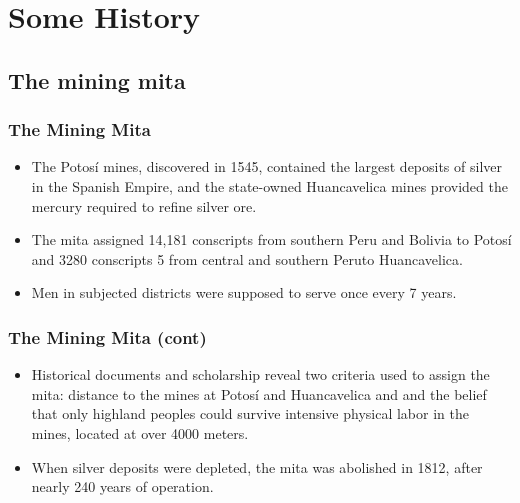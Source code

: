 \section{Some History}
\subsection{The mining mita}

\begin{frame}
\frametitle{The Mining Mita}

\begin{itemize}

 \item The Potosí mines, discovered in 1545, contained the largest deposits of silver in the Spanish Empire, and the state-owned Huancavelica mines provided the mercury required to refine silver ore.\\[20pt]
 
 \item The mita assigned 14,181 conscripts from southern Peru and Bolivia to Potosí and 3280 conscripts 5 from central and southern Peruto Huancavelica.\\[20pt]

\item Men in subjected districts were supposed to serve once every 7 years.
    
\end{itemize}


\end{frame}

\begin{frame}
\frametitle{The Mining Mita (cont)}
    \begin{itemize}
    
\item Historical documents and scholarship reveal two criteria used to assign the mita: distance to the mines at Potosí and Huancavelica and and the belief that only highland peoples could survive intensive physical labor in the mines, located at over 4000 meters.\\[20pt]
 \item When silver deposits were depleted, the mita was abolished in 1812, after nearly 240 years of operation.
  
    \end{itemize}
\end{frame}